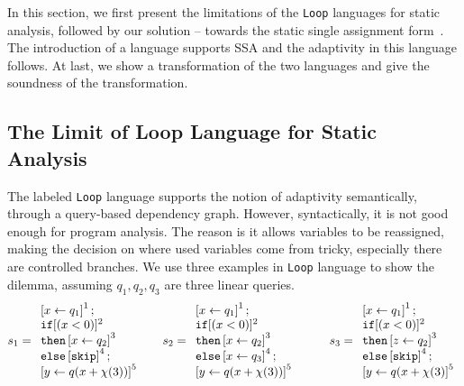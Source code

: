 In this section, we first present the limitations of the {\tt Loop} languages for static analysis, followed by our solution -- towards the static single assignment form~\cite{alpern1988detecting, rosen1988global}. The introduction of a language supports SSA and the adaptivity in this language follows. At last, we show a transformation of the two languages and give the soundness of the transformation. 

\subsection{The Limit of { Loop} Language for Static Analysis}
\label{subsec:limit_of_loop}
 The labeled {\tt Loop} language supports the notion of adaptivity semantically, through a query-based dependency graph. However, syntactically, it is not good enough for program analysis. The reason is it allows variables to be reassigned, making the decision on where used variables come from tricky, especially there are controlled branches. We use three examples in {\tt Loop} language to show the dilemma, assuming $q_1,q_2,q_3$ are three linear queries.
%
\[
 s_1 = \begin{array}{l}
      \left[  \mathrel{ x \leftarrow q_1 } \right]^{1} ; \\
      \mathtt{if}  [(x < 0 )]^{2} \\
      \mathtt{then} \left[ \mathrel{ x \leftarrow q_2 } \right]^{3}\\
      \mathtt{else} \left[ \mathtt{skip} \right]^{4} ; \\
      \left[ \mathrel{ y \leftarrow q(x+\chi(3)) } \right]^{5}
 \end{array}
 ~~~~~
  s_2 = \begin{array}{l}
      \left[  \mathrel{ x \leftarrow q_1 } \right]^{1} ; \\
      \mathtt{if}  [(x < 0 )]^{2} \\
      \mathtt{then} \left[ \mathrel{ x \leftarrow q_2 } \right]^{3}\\
      \mathtt{else} \left[ \mathrel{ x \leftarrow q_3 } \right]^{4} ; \\
      \left[ \mathrel{ y \leftarrow q(x+\chi(3)) } \right]^{5}
 \end{array}
 ~~~~~~~~
  s_3 = \begin{array}{l}
      \left[  \mathrel{ x \leftarrow q_1 } \right]^{1} ; \\
      \mathtt{if}  [(x < 0 )]^{2} \\
      \mathtt{then} \left[ \mathrel{ z \leftarrow q_2 } \right]^{3}\\
      \mathtt{else} \left[ \mathtt{skip} \right]^{4} ; \\
      \left[ \mathrel{ y \leftarrow q(x+\chi(3) } \right]^{5}
 \end{array}
\]
